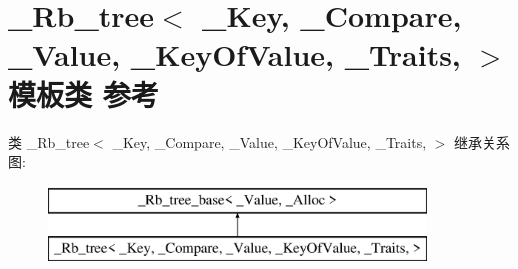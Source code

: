 \hypertarget{class___rb__tree}{}\section{\+\_\+\+Rb\+\_\+tree$<$ \+\_\+\+Key, \+\_\+\+Compare, \+\_\+\+Value, \+\_\+\+Key\+Of\+Value, \+\_\+\+Traits, $>$ 模板类 参考}
\label{class___rb__tree}
类 \+\_\+\+Rb\+\_\+tree$<$ \+\_\+\+Key, \+\_\+\+Compare, \+\_\+\+Value, \+\_\+\+Key\+Of\+Value, \+\_\+\+Traits, $>$ 继承关系图\+:\begin{figure}[H]
\begin{center}
\leavevmode
\includegraphics[height=2.000000cm]{class___rb__tree}
\end{center}
\end{figure}
